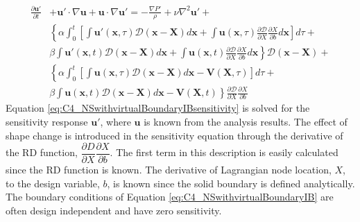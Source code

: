 \begin{align}\label{eq:C4_NSwithvirtualBoundaryIBsensitivity}
    \frac{\partial \mathbf{u}'}{\partial t} &+ 
    \mathbf{u}' \cdot \nabla \mathbf{u} +
    \mathbf{u} \cdot \nabla \mathbf{u}' = 
    -\frac{\nabla P'}{\rho} + 
    \nu \nabla^2 \mathbf{u}' + \nonumber \\
    &\left\{
    \alpha
    \int_0^t
    \left[
        \int \mathbf{u}'(\mathbf{x}, \tau) \mathcal{D}(\mathbf{x} - \mathbf{X}) d\mathbf{x} + 
        \int \mathbf{u}(\mathbf{x}, \tau) \frac{\partial \mathcal{D}}{\partial X} \frac{\partial X}{\partial b} d\mathbf{x}
    \right] d\tau \right.
    + \nonumber \\
    &
    \left.
    \beta
    \int \mathbf{u}'(\mathbf{x}, t) \mathcal{D}(\mathbf{x} - \mathbf{X}) d\mathbf{x} +
    \int \mathbf{u}(\mathbf{x}, t) \frac{\partial \mathcal{D}}{\partial X} \frac{\partial X}{\partial b} d\mathbf{x}
    \right\} \mathcal{D}(\mathbf{x} - \mathbf{X}) + \nonumber \\
    &\left\{
    \alpha
    \int_0^t
    \left[
        \int \mathbf{u}(\mathbf{x}, \tau) \mathcal{D}(\mathbf{x} - \mathbf{X}) d\mathbf{x} - \mathbf{V}(\mathbf{X}, \tau)
    \right] d\tau \right.
    + \nonumber \\
    &
    \left.
    \beta
    \int \mathbf{u}(\mathbf{x}, t) \mathcal{D}(\mathbf{x} - \mathbf{X}) d\mathbf{x} - \mathbf{V}(\mathbf{X}, t)
    \right\}
    \frac{\partial \mathcal{D}}{\partial X} \frac{\partial X}{\partial b}
\end{align}
%
Equation \eqref{eq:C4_NSwithvirtualBoundaryIBsensitivity} is solved for the sensitivity response $\mathbf{u}'$, where $\mathbf{u}$ is known from the analysis results. The effect of shape change is introduced in the sensitivity equation through the derivative of the RD function, $\dfrac{\partial D}{\partial X} \dfrac{\partial X}{\partial b}$. The first term in this description is easily calculated since the RD function is known. The derivative of Lagrangian node location, $X$, to the design variable, $b$, is known since the solid boundary is defined analytically. The boundary conditions of Equation \eqref{eq:C4_NSwithvirtualBoundaryIB} are often design independent and have zero sensitivity.

